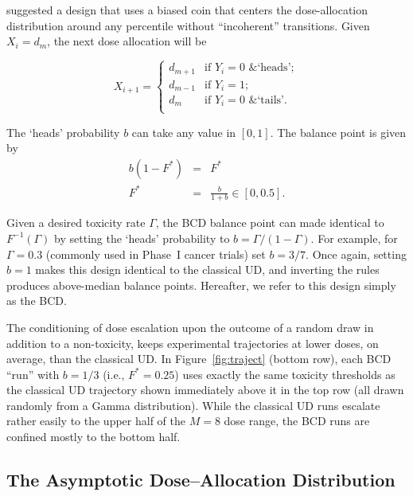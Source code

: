 \cite{Durh:Flou:rand:1994} suggested a design that uses a biased coin that centers the dose-allocation distribution around any percentile without ``incoherent'' transitions. Given $X_i=d_m$, the next dose allocation will be

\begin{equation}\label{eq:DF_BCD}
X_{i+1}=
\begin{cases}
d_{m+1} &\textrm{if $Y_i=0$ \& `heads'};\\
d_{m-1} &\textrm{if $Y_i=1$};\\
d_m &\textrm{if $Y_i=0$ \& `tails'}.\\
\end{cases}
\end{equation}

The `heads' probability $b$ can take any value in $[0,1]$. The balance point is given by
\begin{equation}\label{eq:bcdx*}
\begin{array}{rcl}
    b\left(1-F^*\right) &=& F^*\\
    F^* &=& \frac{b}{1+b}\in[0,0.5].
\end{array}
\end{equation}

Given a desired toxicity rate $\Gamma$, the BCD balance point can made identical to $F^{-1}(\Gamma)$ by setting the `heads' probability to $b=\Gamma/(1-\Gamma)$. For example, for $\Gamma=0.3$ (commonly used in Phase~I cancer trials) set $b=3/7$. Once again, setting $b=1$ makes this design identical to the classical UD, and inverting the rules produces above-median balance points. Hereafter, we refer to this design simply as the BCD.

The conditioning of dose escalation upon the outcome of a random draw in addition to a non-toxicity, keeps experimental trajectories at lower doses, on average, than the classical UD. In Figure~\ref{fig:traject} (bottom row), each BCD ``run'' with $b=1/3$ (i.e., $F^*=0.25$) uses exactly the same toxicity thresholds as the classical UD trajectory shown immediately above it in the top row (all drawn randomly from a Gamma distribution). While the classical UD runs escalate rather easily to the upper half of the $M=8$ dose range, the BCD runs are confined mostly to the bottom half.

\subsection{The Asymptotic Dose--Allocation Distribution}\label{sec:pi}

